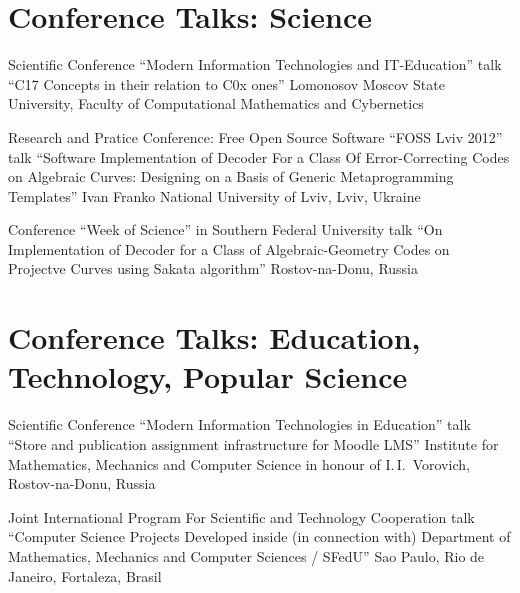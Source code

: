 \documentclass[11pt,a4paper]{moderncv}   %
\newcommand{\CPP}
{C\nolinebreak[4]\hspace{-.05em}\raisebox{.35ex}{\scriptsize\bfseries +\hspace{-.05em}+}}
\begin{document}


{}

\section{Conference Talks: Science}

%
    {Scientific Conference “Modern Information Technologies and IT-Education”}%
    {talk “\protect\CPP{}17 Concepts in their relation to \protect\CPP{}0x ones”}
    {Lomonosov Moscov State University, Faculty of Computational Mathematics and Cybernetics}{}%
    {}

%
    {Research and Pratice Conference: Free Open Source Software “FOSS Lviv 2012”}%
    {talk “Software Implementation of Decoder For a Class Of Error-Correcting Codes on Algebraic Curves: Designing on a Basis of Generic Metaprogramming Templates”}%
    {Ivan Franko National University of Lviv, Lviv, Ukraine}{}%
    {}

%
    {Conference “Week of Science” in Southern Federal University}%
    {talk “On Implementation of Decoder for a Class of Algebraic-Geometry Codes on Projectve Curves using Sakata algorithm”}%
    {Rostov-na-Donu, Russia}{}%
    {}

\section{Conference Talks: Education, Technology, Popular Science}

%
    {Scientific Conference “Modern Information Technologies in Education”}%
    {talk “Store and publication assignment infrastructure for Moodle LMS”}
    {Institute for Mathematics, Mechanics and Computer Science in honour of I.\,I.~Vorovich, Rostov-na-Donu, Russia}{}%
    {}

%
    {Joint International Program For Scientific and Technology Cooperation}%
    {talk “Computer Science Projects Developed inside (in connection with) Department of Mathematics, Mechanics and Computer Sciences / SFedU”}
    {Sao Paulo, Rio de Janeiro, Fortaleza, Brasil}{}%
    {}
\end{document}
